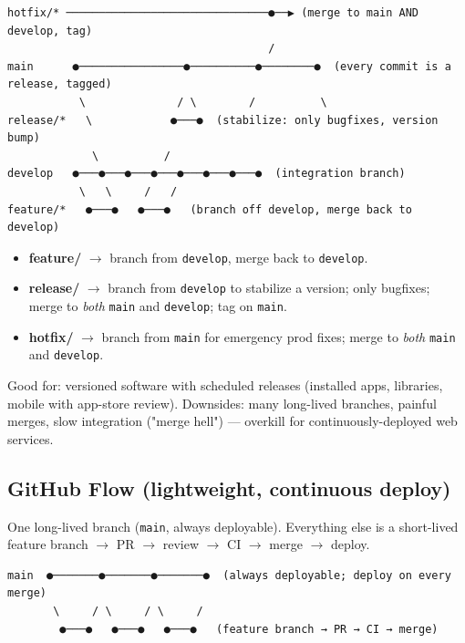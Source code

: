 \documentclass[11pt]{article}
\providecommand{\tightlist}{\setlength{\itemsep}{1pt}\setlength{\parskip}{0pt}}
\begin{document}
\setcodelang{}

\begin{verbatim}
hotfix/* ───────────────────────────────●──▶ (merge to main AND develop, tag)
                                        /
main      ●────────────────●──────────●────────●  (every commit is a release, tagged)
           \              / \        /          \
release/*   \            ●───●  (stabilize: only bugfixes, version bump)
             \          /
develop   ●───●───●───●───●───●───●───●  (integration branch)
           \   \     /   /
feature/*   ●───●   ●───●   (branch off develop, merge back to develop)
\end{verbatim}

\begin{itemize}
\tightlist
\item
  \textbf{feature/} \(\rightarrow\) branch from \texttt{develop}, merge back to \texttt{develop}.
\item
  \textbf{release/} \(\rightarrow\) branch from \texttt{develop} to stabilize a version; only bugfixes; merge to \emph{both} \texttt{main} and \texttt{develop}; tag on \texttt{main}.
\item
  \textbf{hotfix/} \(\rightarrow\) branch from \texttt{main} for emergency prod fixes; merge to \emph{both} \texttt{main} and \texttt{develop}.
\end{itemize}

Good for: versioned software with scheduled releases (installed apps, libraries, mobile with app-store review). Downsides: many long-lived branches, painful merges, slow integration ("merge hell") --- overkill for continuously-deployed web services.

\subsection{GitHub Flow (lightweight, continuous deploy)}\label{github-flow-lightweight-continuous-deploy}

One long-lived branch (\texttt{main}, always deployable). Everything else is a short-lived feature branch \(\rightarrow\) PR \(\rightarrow\) review \(\rightarrow\) CI \(\rightarrow\) merge \(\rightarrow\) deploy.

\setcodelang{}

\begin{verbatim}
main  ●───────●───────●───────●  (always deployable; deploy on every merge)
       \     / \     / \     /
        ●───●   ●───●   ●───●   (feature branch → PR → CI → merge)
\end{verbatim}
\end{document}
